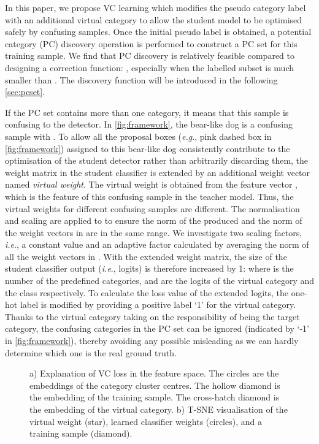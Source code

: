 \documentclass[runningheads]{llncs}
\def\eg{\emph{e.g}., } \def\Eg{\emph{E.g}., }
\def\ie{\emph{i.e}., } \def\Ie{\emph{I.e}., }
\begin{document}
In this paper, we propose VC learning which modifies the pseudo category label with an additional virtual category to allow the student model to be optimised safely by confusing samples. Once the initial pseudo label  is obtained, a potential category (PC) discovery operation is performed to construct a PC set  for this training sample. We find that PC discovery is relatively feasible compared to designing a correction function:  , especially when the labelled subset  is much smaller than . The discovery function will be introduced in the following \cref{sec:pcset}.

If the PC set contains more than one category, it means that this sample is confusing to the detector. In \cref{fig:framework}, the bear-like dog is a confusing sample with . To allow all the proposal boxes (\eg pink dashed box in \cref{fig:framework}) assigned to this bear-like dog consistently contribute to the optimisation of the student detector  rather than arbitrarily discarding them, the weight matrix  in the student classifier is extended by an additional weight vector  named \textit{virtual weight}. The virtual weight  is obtained from the feature vector , which is the feature of this confusing sample in the teacher model. Thus, the virtual weights for different confusing samples are different. The normalisation and scaling are applied to  to ensure the norm of the  produced  and the norm of the weight vectors in  are in the same range. We investigate two scaling factors, \ie a constant value and an adaptive factor calculated by averaging the norm of all the weight vectors in . With the extended weight matrix, the size of the student classifier output (\ie logits) is therefore increased by 1:
 where  is the number of the predefined categories,  and  are the logits of the virtual category and the class  respectively. To calculate the loss value of the extended logits, the one-hot label is modified by providing a positive label `1' for the virtual category. Thanks to the virtual category taking on the responsibility of being the target category, the confusing categories in the PC set can be ignored (indicated by `-1' in \cref{fig:framework}), thereby avoiding any possible misleading as we can hardly determine which one is the real ground truth.

\begin{figure}[t]
\centering
\vspace{-1.5em}
\vspace{-1em}
\caption{a) Explanation of VC loss in the feature space. The circles are the embeddings of the category cluster centres. The hollow diamond is the embedding of the training sample. The cross-hatch diamond is the embedding of the virtual category. b) T-SNE visualisation of the virtual weight (star), learned classifier weights (circles), and a training sample (diamond).}
\vspace{-1em}
\end{figure}
\end{document}
